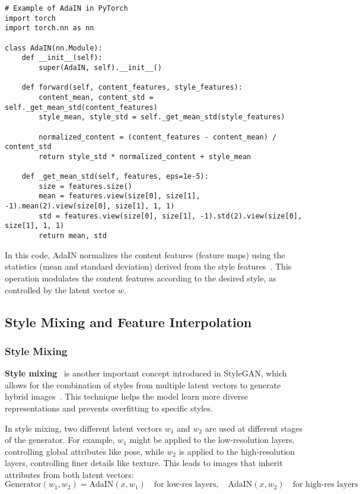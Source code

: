 \begin{lstlisting}[style=python]
# Example of AdaIN in PyTorch
import torch
import torch.nn as nn

class AdaIN(nn.Module):
    def __init__(self):
        super(AdaIN, self).__init__()

    def forward(self, content_features, style_features):
        content_mean, content_std = self._get_mean_std(content_features)
        style_mean, style_std = self._get_mean_std(style_features)

        normalized_content = (content_features - content_mean) / content_std
        return style_std * normalized_content + style_mean

    def _get_mean_std(self, features, eps=1e-5):
        size = features.size()
        mean = features.view(size[0], size[1], -1).mean(2).view(size[0], size[1], 1, 1)
        std = features.view(size[0], size[1], -1).std(2).view(size[0], size[1], 1, 1)
        return mean, std
\end{lstlisting}

In this code, AdaIN normalizes the content features (feature maps) using the statistics (mean and standard deviation) derived from the style features~\cite{karras2020analyzing}. This operation modulates the content features according to the desired style, as controlled by the latent vector \( w \).

\subsection{Style Mixing and Feature Interpolation}

\subsubsection{Style Mixing}

\textbf{Style mixing}~\cite{zhang2022styleswin} is another important concept introduced in StyleGAN, which allows for the combination of styles from multiple latent vectors to generate hybrid images~\cite{karras2020analyzing}. This technique helps the model learn more diverse representations and prevents overfitting to specific styles.

In style mixing, two different latent vectors \( w_1 \) and \( w_2 \) are used at different stages of the generator. For example, \( w_1 \) might be applied to the low-resolution layers, controlling global attributes like pose, while \( w_2 \) is applied to the high-resolution layers, controlling finer details like texture. This leads to images that inherit attributes from both latent vectors:
\[
\text{Generator}(w_1, w_2) = \text{AdaIN}(x, w_1) \quad \text{for low-res layers}, \quad \text{AdaIN}(x, w_2) \quad \text{for high-res layers}
\]

